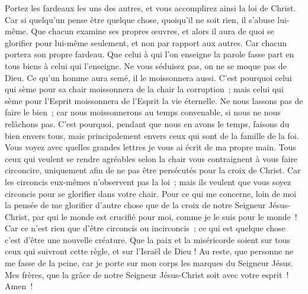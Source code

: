 \begin{multicols}{2}
Portez les fardeaux les uns des autres, et vous accomplirez ainsi la loi de Christ.
Car si quelqu'un pense être quelque chose, quoiqu'il ne soit rien, il s'abuse lui-même.
Que chacun examine ses propres œuvres, et alors il aura de quoi se glorifier pour lui-même seulement, et non par rapport aux autres.
Car chacun portera son propre fardeau.
Que celui à qui l'on enseigne la parole fasse part en tous biens à celui qui l'enseigne.
Ne vous séduisez pas, on ne se moque pas de Dieu. Ce qu'un homme aura semé, il le moissonnera aussi.
C'est pourquoi celui qui sème pour sa chair moissonnera de la chair la corruption~; mais celui qui sème pour l'Esprit moissonnera de l'Esprit la vie éternelle.
Ne nous lassons pas de faire le bien~; car nous moissonnerons au temps convenable, si nous ne nous relâchons pas.
C'est pourquoi, pendant que nous en avons le temps, faisons du bien envers tous, mais principalement envers ceux qui sont de la famille de la foi.
Vous voyez avec quelles grandes lettres je vous ai écrit de ma propre main.
Tous ceux qui veulent se rendre agréables selon la chair vous contraignent à vous faire circoncire, uniquement afin de ne pas être persécutés pour la croix de Christ.
Car les circoncis eux-mêmes n'observent pas la loi~; mais ils veulent que vous soyez circoncis pour se glorifier dans votre chair.
Pour ce qui me concerne, loin de moi la pensée de me glorifier d'autre chose que de la croix de notre Seigneur Jésus-Christ, par qui le monde est crucifié pour moi, comme je le suis pour le monde~!
Car ce n'est rien que d'être circoncis ou incirconcis~; ce qui est quelque chose c'est d'être une nouvelle créature.
Que la paix et la miséricorde soient sur tous ceux qui suivront cette règle, et sur l'Israël de Dieu !
Au reste, que personne ne me fasse de la peine, car je porte sur mon corps les marques du Seigneur Jésus.
Mes frères, que la grâce de notre Seigneur Jésus-Christ soit avec votre esprit~! Amen~!
\PPE{}
\end{multicols}
